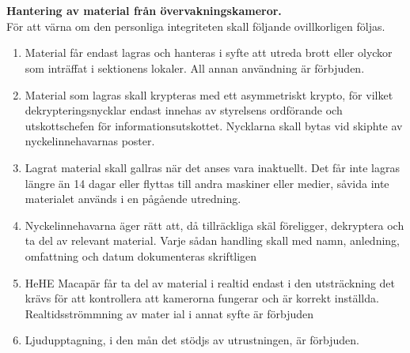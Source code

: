 \documentclass[10pt]{article}
\begin{document}
\section*{\doctitle}

\textbf{Hantering av material från övervakningskameror.}\\
För att värna om den personliga integriteten skall följande ovillkorligen följas.

\begin{enumerate}[label={\arabic{enumi}.}]

\item Material får endast lagras och hanteras i syfte att utreda brott
eller olyckor som inträffat i sektionens lokaler. All annan användning är förbjuden.

\item Material som lagras skall krypteras med ett asymmetriskt krypto, för vilket
dekrypteringsnycklar endast innehas av styrelsens ordförande och utskottschefen för
informationsutskottet. Nycklarna skall bytas vid skiphte av nyckelinnehavarnas poster.

\item Lagrat material skall gallras när det anses vara inaktuellt. Det
får inte lagras längre än 14 dagar eller flyttas till andra maskiner eller medier, såvida inte materialet används i en
pågående utredning.

\item Nyckelinnehavarna äger rätt att, då tillräckliga skäl föreligger, dekryptera och ta del av
relevant material. Varje sådan handling skall med namn, anledning, omfattning och
datum dokumenteras skriftligen

\item HeHE Macapär får ta del av material i realtid endast i den utsträckning det krävs för att kontrollera
att kamerorna fungerar och är korrekt inställda. Realtidsströmmning av mater
ial i annat syfte är förbjuden

\item Ljudupptagning, i den mån det stödjs av utrustningen, är förbjuden.

\end{enumerate}
\end{document}
